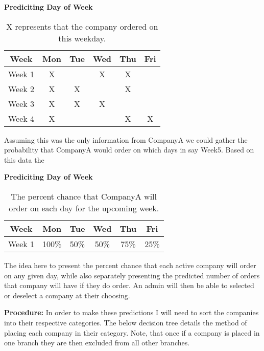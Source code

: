 \documentclass[12pt]{article}
\begin{document}
\begin{table}[h!]
\begin{center}
\textbf{Prediciting Day of Week} \\ [1.2ex]

 \begin{tabular}{||c c c c c c||} 
 \hline
 \textbf{Week}&\textbf{Mon}&\textbf{Tue}&\textbf{Wed}&\textbf{Thu}&\textbf{Fri}\\ [0.7ex] 
 \hline\hline
 Week 1&X&&X&X&  \\ [1ex]
 \hline
 Week 2&X&X&&X&  \\ [1ex]
 \hline
 Week 3&X&X&X&&  \\ [1ex]
 \hline
 Week 4&X&&&X&X \\ [1ex]
 \hline
\end{tabular}
\caption{X represents that the company ordered on this weekday.}
\label{}
\end{center}
\end{table}

Assuming this was the only information from CompanyA we could gather the probability that CompanyA would order on which days in say Week5. Based on this data the 

\begin{table}[h!]
\begin{center}
\textbf{Prediciting Day of Week} \\ [1.2ex]

 \begin{tabular}{||c c c c c c||} 
 \hline
 \textbf{Week}&\textbf{Mon}&\textbf{Tue}&\textbf{Wed}&\textbf{Thu}&\textbf{Fri}\\ [0.7ex] 
 \hline\hline
 Week 1&100\%&50\%&50\%&75\%&25\%  \\ [1ex]
 \hline
\end{tabular}
\caption{The percent chance that CompanyA will order on each day for the upcoming week.}
\label{}
\end{center}
\end{table}

The idea here to present the percent chance that each active company will order on any given day, while also separately presenting the predicted number of orders that company will have if they do order. An admin will then be able to selected or deselect a company at their choosing.


\textbf{Procedure:}
In order to make these predictions I will need to sort the companies into their respective categories. The below decision tree details the method of placing each company in their category. Note, that once if a company is placed in one branch they are then excluded from all other branches.
\end{document}
